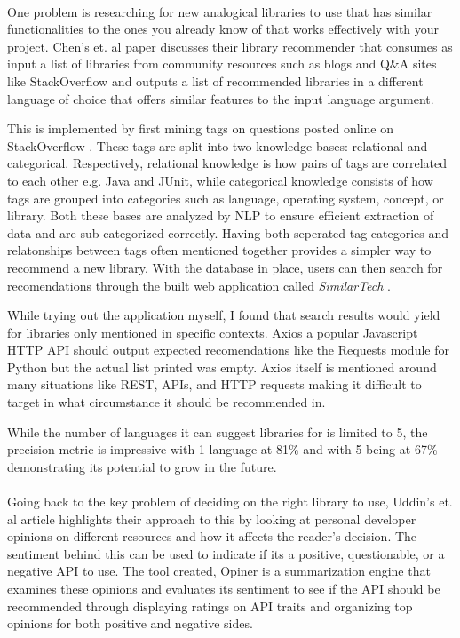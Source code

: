 \documentclass[12pt]{article}
\begin{document}
\paragraph{}
One problem is researching for new analogical libraries to use that has similar functionalities 
to the ones you already know of that works effectively with your project. Chen's et. al \cite{analogical} paper discusses their library recommender 
that consumes as input a list of libraries from community resources such as blogs and Q\&A sites like StackOverflow \cite{stackoverflow} 
and outputs a list of recommended libraries in a different language of choice that offers similar features to the input language argument. 

This is implemented by first mining tags on questions posted online on StackOverflow \cite{stackoverflow}.
These tags are split into two knowledge bases: relational and categorical. Respectively, relational knowledge is how pairs of
tags are correlated to each other e.g. Java and JUnit, while categorical knowledge consists of how tags are grouped into categories such as 
language, operating system, concept, or library. 
Both these bases are analyzed by NLP to ensure efficient extraction of data and are sub categorized correctly.
Having both seperated tag categories and relatonships between tags often mentioned together provides a simpler way to recommend a new library. 
With the database in place, users can then search for recomendations through the built
web application called \textit{SimilarTech} \cite{similartech}.

While trying out the application myself, I found that search results would yield for libraries only mentioned in specific contexts.
Axios \cite{axios} a popular Javascript HTTP API should output expected recomendations 
like the Requests \cite{requests} module for Python but the actual list printed was empty.
Axios \cite{axios} itself is mentioned around many situations like REST, APIs, and HTTP requests making it difficult to target in what circumstance
it should be recommended in.

While the number of languages it can suggest libraries for is limited to 5, the precision metric is impressive
with 1 language at 81\% and with 5 being at 67\% demonstrating its potential to grow in the future.

\paragraph{}
Going back to the key problem of deciding on the right library to use, Uddin's et. al \cite{opinerarticle} article
highlights their approach to this by looking at personal developer opinions on different resources
and how it affects the reader's decision. The sentiment behind this can be used to indicate if its 
a positive, questionable, or a negative API to use. The tool created, Opiner \cite{opiner} is a summarization engine
that examines these opinions and evaluates its sentiment to see if the API should be recommended through 
displaying ratings on API traits and organizing top opinions for both positive and negative sides. 
\end{document}
